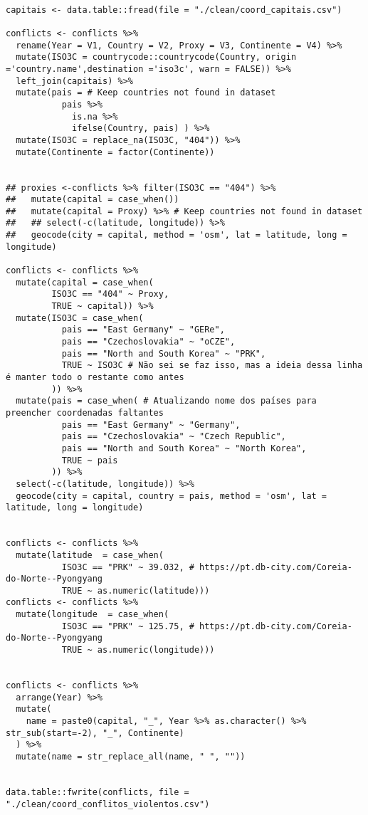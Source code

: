 \documentclass[11pt]{article}
\begin{document}
\begin{verbatim}

capitais <- data.table::fread(file = "./clean/coord_capitais.csv")

conflicts <- conflicts %>%
  rename(Year = V1, Country = V2, Proxy = V3, Continente = V4) %>%
  mutate(ISO3C = countrycode::countrycode(Country, origin ='country.name',destination ='iso3c', warn = FALSE)) %>%
  left_join(capitais) %>%
  mutate(pais = # Keep countries not found in dataset
           pais %>%
             is.na %>%
             ifelse(Country, pais) ) %>%
  mutate(ISO3C = replace_na(ISO3C, "404")) %>%
  mutate(Continente = factor(Continente))


## proxies <-conflicts %>% filter(ISO3C == "404") %>%
##   mutate(capital = case_when())
##   mutate(capital = Proxy) %>% # Keep countries not found in dataset
##   ## select(-c(latitude, longitude)) %>%
##   geocode(city = capital, method = 'osm', lat = latitude, long = longitude)

conflicts <- conflicts %>%
  mutate(capital = case_when(
         ISO3C == "404" ~ Proxy,
         TRUE ~ capital)) %>%
  mutate(ISO3C = case_when(
           pais == "East Germany" ~ "GERe",
           pais == "Czechoslovakia" ~ "oCZE",
           pais == "North and South Korea" ~ "PRK",
           TRUE ~ ISO3C # Não sei se faz isso, mas a ideia dessa linha é manter todo o restante como antes
         )) %>%
  mutate(pais = case_when( # Atualizando nome dos países para preencher coordenadas faltantes
           pais == "East Germany" ~ "Germany",
           pais == "Czechoslovakia" ~ "Czech Republic",
           pais == "North and South Korea" ~ "North Korea",
           TRUE ~ pais
         )) %>%
  select(-c(latitude, longitude)) %>%
  geocode(city = capital, country = pais, method = 'osm', lat = latitude, long = longitude)
  
    
conflicts <- conflicts %>%
  mutate(latitude  = case_when(
           ISO3C == "PRK" ~ 39.032, # https://pt.db-city.com/Coreia-do-Norte--Pyongyang
           TRUE ~ as.numeric(latitude)))
conflicts <- conflicts %>%
  mutate(longitude  = case_when(
           ISO3C == "PRK" ~ 125.75, # https://pt.db-city.com/Coreia-do-Norte--Pyongyang
           TRUE ~ as.numeric(longitude)))


conflicts <- conflicts %>%
  arrange(Year) %>%
  mutate(
    name = paste0(capital, "_", Year %>% as.character() %>% str_sub(start=-2), "_", Continente)
  ) %>%
  mutate(name = str_replace_all(name, " ", ""))
    

data.table::fwrite(conflicts, file = "./clean/coord_conflitos_violentos.csv")
\end{verbatim}
\end{document}
